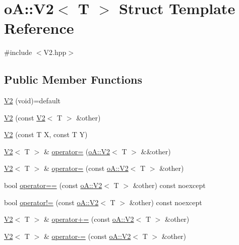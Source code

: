 \hypertarget{structo_a_1_1_v2}{}\section{oA\+:\+:V2$<$ T $>$ Struct Template Reference}
\label{structo_a_1_1_v2}


{\ttfamily \#include $<$V2.\+hpp$>$}

\subsection*{Public Member Functions}
\begin{DoxyCompactItemize}
\item 
\mbox{\hyperlink{structo_a_1_1_v2_a6b62d1b3e8de957a3c2d26925b6508e1}{V2}} (void)=default
\item 
\mbox{\hyperlink{structo_a_1_1_v2_adb120ae33b44a00dd2b40136283422eb}{V2}} (const \mbox{\hyperlink{structo_a_1_1_v2}{V2}}$<$ T $>$ \&other)
\item 
\mbox{\hyperlink{structo_a_1_1_v2_a382c0ae0124a0dd755ce870f40651a41}{V2}} (const T X, const T Y)
\item 
\mbox{\hyperlink{structo_a_1_1_v2}{V2}}$<$ T $>$ \& \mbox{\hyperlink{structo_a_1_1_v2_ac8fc6159c4258a767540f8af7971348b}{operator=}} (\mbox{\hyperlink{structo_a_1_1_v2}{o\+A\+::\+V2}}$<$ T $>$ \&\&other)
\item 
\mbox{\hyperlink{structo_a_1_1_v2}{V2}}$<$ T $>$ \& \mbox{\hyperlink{structo_a_1_1_v2_a144fb5845961c65ae8d6417ecca9e395}{operator=}} (const \mbox{\hyperlink{structo_a_1_1_v2}{o\+A\+::\+V2}}$<$ T $>$ \&other)
\item 
bool \mbox{\hyperlink{structo_a_1_1_v2_a7f3c992b4271b76c704b30a42801facb}{operator==}} (const \mbox{\hyperlink{structo_a_1_1_v2}{o\+A\+::\+V2}}$<$ T $>$ \&other) const noexcept
\item 
bool \mbox{\hyperlink{structo_a_1_1_v2_a5ca601a9f46507dba0e6a78e4e6fb06e}{operator!=}} (const \mbox{\hyperlink{structo_a_1_1_v2}{o\+A\+::\+V2}}$<$ T $>$ \&other) const noexcept
\item 
\mbox{\hyperlink{structo_a_1_1_v2}{V2}}$<$ T $>$ \& \mbox{\hyperlink{structo_a_1_1_v2_ab5f783ae5cda46636a17dda5bc552a13}{operator+=}} (const \mbox{\hyperlink{structo_a_1_1_v2}{o\+A\+::\+V2}}$<$ T $>$ \&other)
\item 
\mbox{\hyperlink{structo_a_1_1_v2}{V2}}$<$ T $>$ \& \mbox{\hyperlink{structo_a_1_1_v2_a6e33681639974e51d66db212b7fcddbc}{operator-\/=}} (const \mbox{\hyperlink{structo_a_1_1_v2}{o\+A\+::\+V2}}$<$ T $>$ \&other)

\end{DoxyCompactItemize}
